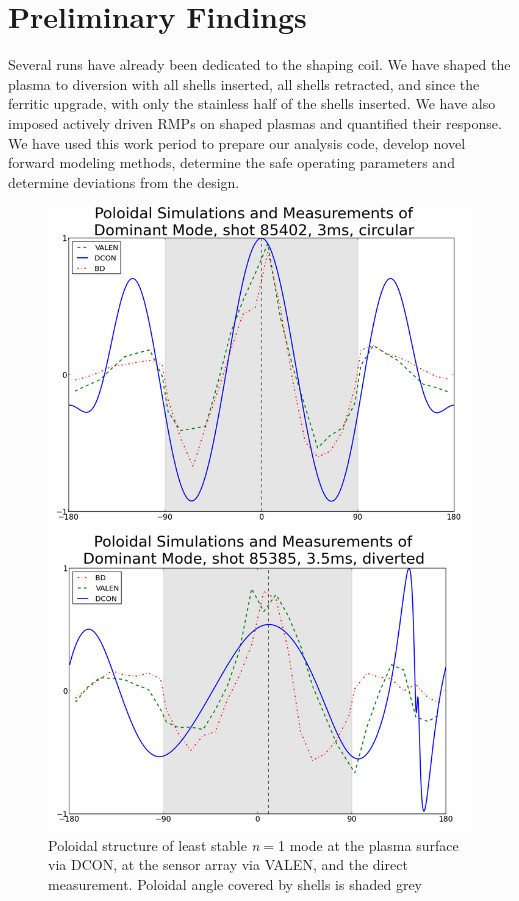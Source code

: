 \documentclass[aps,preprint,showpacs,superscriptaddress,groupedaddress]{revtex4}  %
\begin{document}
\section{Preliminary Findings}
	Several runs have already been dedicated to the shaping coil.  We have shaped the plasma to diversion with all shells inserted, all shells retracted, and since the ferritic upgrade, with only the stainless half of the shells inserted.  We have also imposed actively driven RMPs on shaped plasmas and quantified their response.  We have used this work period to prepare our analysis code, develop novel forward modeling methods, determine the safe operating parameters and determine deviations from the design. \par 
\begin{figure}[b]
	\centering
\includegraphics[scale=.3]{../Plots/DCON_VALEN_BD_comp_sh_unsh_mod.png}\caption{Poloidal structure of least stable \textit{n}$=$1 mode at the plasma surface via DCON, at the sensor array via VALEN, and the direct measurement. Poloidal angle covered by shells is shaded grey}
	\label{nat_mode_sim_v_meas}
	\end{figure}
	
\end{document}
